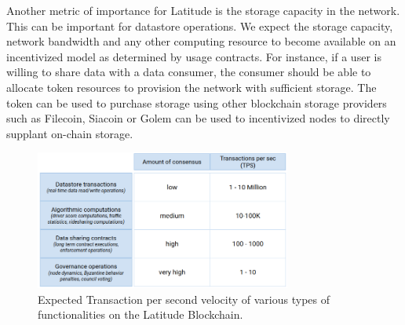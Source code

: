 Another metric of importance for Latitude is the storage capacity in the network. This can be important for
datastore operations. We expect the storage capacity, network bandwidth and any other computing resource to become
available on an incentivized model as determined by usage contracts. For instance, if a user is willing to share data with
a data consumer, the consumer should be able to allocate token resources to provision the network with sufficient
storage. The token can be used to purchase storage using other blockchain storage providers such as Filecoin, Siacoin or
Golem can be used to incentivized nodes to directly supplant on-chain storage.

\begin{figure}[t]
    \centering
    \includegraphics[width=0.75\textwidth]{tps_lat2.png}
  \caption{Expected Transaction per second velocity of various types of functionalities on the Latitude Blockchain.}
    \label{fig:tps_lat}
\end{figure}

